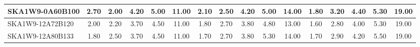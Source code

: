 \begin{table}[H]
{{\begin{tabular}{|lccccc||ccccc||ccccc|}
SKA1W9-0A60B100 & 2.70 \cellcolor{blue!43.20} & 2.00 \cellcolor{red!25.00} & 4.20 \cellcolor{green!60.00} & 5.00 \cellcolor{orange!60.00} & 11.00 \cellcolor{purple!60.00} & 2.10 \cellcolor{blue!39.00} & 2.50 \cellcolor{red!39.00} & 4.20 \cellcolor{green!60.00} & 5.00 \cellcolor{orange!44.25} & 14.00 \cellcolor{purple!60.00} & 1.80 \cellcolor{blue!26.40} & 3.20 \cellcolor{red!60.00} & 4.40 \cellcolor{green!60.00} & 5.30 \cellcolor{orange!52.36} & 19.00 \cellcolor{purple!39.00}\\ \hline 
SKA1W9-12A72B120 & 2.00 \cellcolor{blue!23.60} & 2.20 \cellcolor{red!32.00} & 3.70 \cellcolor{green!25.00} & 4.50 \cellcolor{orange!25.00} & 11.00 \cellcolor{purple!60.00} & 1.80 \cellcolor{blue!23.25} & 2.70 \cellcolor{red!47.40} & 3.80 \cellcolor{green!26.40} & 4.80 \cellcolor{orange!33.75} & 13.00 \cellcolor{purple!18.00} & 1.60 \cellcolor{blue!18.00} & 2.80 \cellcolor{red!32.00} & 4.00 \cellcolor{green!36.00} & 5.30 \cellcolor{orange!52.36} & 19.00 \cellcolor{purple!39.00}\\ \hline 
SKA1W9-12A80B133 & 1.80 \cellcolor{blue!18.00} & 2.50 \cellcolor{red!42.50} & 3.70 \cellcolor{green!25.00} & 4.50 \cellcolor{orange!25.00} & 11.00 \cellcolor{purple!60.00} & 1.70 \cellcolor{blue!18.00} & 2.70 \cellcolor{red!47.40} & 3.80 \cellcolor{green!26.40} & 5.30 \cellcolor{orange!60.00} & 14.00 \cellcolor{purple!60.00} & 1.70 \cellcolor{blue!22.20} & 2.90 \cellcolor{red!39.00} & 4.20 \cellcolor{green!48.00} & 5.50 \cellcolor{orange!60.00} & 19.00 \cellcolor{purple!39.00}\\ \hline 
\end{tabular}}
\vspace{-0.300000cm}
\hspace{1cm} 
}
\end{table}
